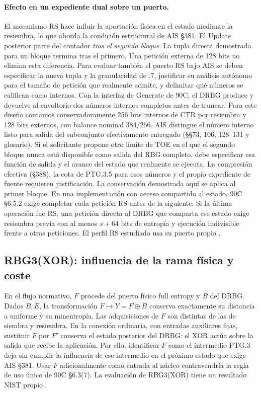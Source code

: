 \paragraph{Efecto en un expediente dual sobre un puerto.}
El mecanismo RS hace influir la aportación física en el estado mediante la
resiembra, lo que aborda la condición estructural de AIS §381. El Update
posterior parte del contador \emph{tras el segundo bloque}. La tupla
directa demostrada para un bloque termina tras el primero. Una petición
externa de 128 bits no elimina esta diferencia. Para evaluar también el
puerto RS bajo AIS se deben especificar la nueva tupla y la granularidad
de .7, justificar su análisis autónomo para el tamaño de petición que
realmente admite, y delimitar qué números se califican como internos.
Con la interfaz de Generate de 90C, el DRBG produce y devuelve al
envoltorio dos números internos completos antes de truncar. Para este
diseño contamos conservadoramente 256 bits internos de CTR por resiembra
y 128 bits externos, con balance nominal $384/256$. AIS distingue el
número interno listo para salida del subconjunto efectivamente entregado
(§§73, 106, 128--131 y glosario). Si el solicitante propone otro límite
de TOE en el que el segundo bloque nunca está disponible como salida del
RBG completo, debe especificar esa función de salida y el avance del
estado que realmente se ejecuta. La compresión efectiva (§388), la cota de PTG.3.5 para esos
números y el propio expediente de fuente requieren justificación.
La conservación demostrada aquí se aplica al primer bloque. En una
implementación con acceso compartido al estado, 90C §6.5.2 exige completar
cada petición RS antes de la siguiente. Si la última operación fue RS,
una petición directa al DRBG que comparta ese estado exige resiembra
previa con al menos $s+64$ bits de entropía y ejecución indivisible
frente a otras peticiones. El perfil RS estudiado usa su puerto propio
\cite[§§73, 106, 128--131, 385--388 y glosario]{ais}\cite[§6.5.2(1)--(3)]{nist90c}.

\subsection{RBG3(XOR): influencia de la rama física y coste}
En el flujo normativo, $F$ procede del puerto físico full entropy
y $B$ del DRBG. Dados $B,E$, la transformación $F\mapsto Y=F\oplus B$
conserva exactamente su distancia a uniforme y su minentropía. Las
adquisiciones de $F$ son distintas de las de siembra y resiembra.
En la conexión ordinaria, con entradas auxiliares fijas, sustituir
$F$ por $F'$ conserva el estado posterior del DRBG: el XOR actúa sobre
la salida que recibe la aplicación. Por ello, identificar $F$ como el
intermedio PTG.3 deja sin cumplir la influencia de ese intermedio en
el próximo estado que exige AIS §381. Usar $F$ adicionalmente como
entrada al núcleo contravendría la regla de uso único de 90C §6.3(7).
La evaluación de RBG3(XOR) tiene un resultado NIST propio
\cite[§§375, 380--383]{ais}\cite[§§6.3(7), 6.4.1.2 y 6.4.2]{nist90c}.


